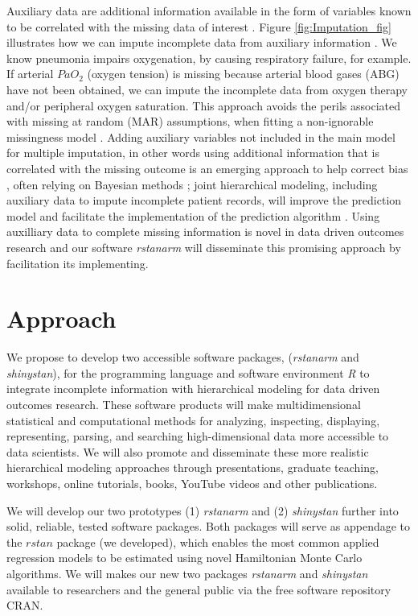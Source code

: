 \documentclass[11pt,notitlepage]{article}
\begin{document}
Auxiliary data are additional information available in the form of variables known 
to be correlated with the missing data of interest 
\cite{Hall_25389642,Daniels24571539}. Figure \ref{fig:Imputation_fig} 
illustrates how we can impute incomplete data from auxiliary information 
\cite{Ibrahim2001auxilliaryImputaton,Schomaker23873614}. We know pneumonia 
impairs oxygenation, by causing respiratory failure, for example. If 
arterial $PaO_2$ (oxygen tension) is missing because arterial blood 
gases (ABG) have not been obtained, we can impute the incomplete data 
from oxygen therapy and/or peripheral oxygen saturation\cite{Hall_25389642}. 
This approach avoids the perils associated with missing at random (MAR) 
assumptions, when fitting a non-ignorable missingness model \cite{Wang_20029935}. 
Adding auxiliary variables not included in the main model for multiple imputation, 
in other words using additional information that is correlated with the missing 
outcome is an emerging approach to help correct bias 
\cite{Meng1994, Collins_11778676, Rubin1996}, often relying on 
Bayesian methods \cite{Daniels2008, Schafer1997}; joint hierarchical 
modeling, including auxiliary data to impute incomplete patient records, 
will improve the prediction model and facilitate the implementation of the 
prediction algorithm \cite{Hall_25389642}. Using auxilliary data to complete 
missing information is novel in data driven outcomes research and our 
software \textit{rstanarm} will disseminate this promising approach by 
facilitation its implementing. 

\part*{Approach}

We propose to develop two accessible software packages, (\textit{rstanarm} 
and \textit{shinystan}), for the programming language and software environment 
\textit{R} to integrate incomplete information with hierarchical modeling for 
data driven outcomes research. These software products will make 
multidimensional statistical and computational methods for 
analyzing, inspecting, displaying, representing, parsing, and 
searching high-dimensional data more accessible to 
data scientists. We will also promote and disseminate these more realistic 
hierarchical modeling approaches through presentations, graduate teaching, 
workshops, online tutorials, books, YouTube videos and other publications.

We will develop our two prototypes (1) \textit{rstanarm} and (2) 
\textit{shinystan} further into solid, reliable, tested software packages. 
Both packages will serve as appendage to the $rstan$ package (we developed), 
which enables the most common applied regression models to be estimated using 
novel Hamiltonian Monte Carlo algorithms. We will makes our new two 
packages \textit{rstanarm} and \textit{shinystan} available to researchers 
and the general public via the free software repository CRAN. 
\end{document}
